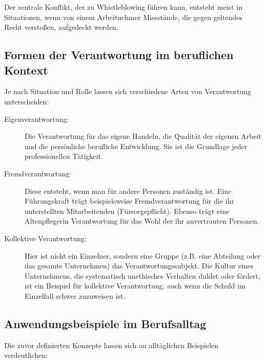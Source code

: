 \documentclass[
    12pt,               %
    a4paper,            %
    ngerman             %
]{scrartcl}
\begin{document}
Der zentrale Konflikt, der zu Whistleblowing führen kann, entsteht meist in Situationen, wenn von einem Arbeitnehmer Missstände, die gegen geltendes Recht verstoßen, aufgedeckt werden.

\subsection{Formen der Verantwortung im beruflichen Kontext}
Je nach Situation und Rolle lassen sich verschiedene Arten von Verantwortung unterscheiden:

\begin{description}
    \item[Eigenverantwortung:] Die Verantwortung für das eigene Handeln, die Qualität der eigenen Arbeit und die persönliche berufliche Entwicklung. Sie ist die Grundlage jeder professionellen Tätigkeit.
    \item[Fremdverantwortung:] Diese entsteht, wenn man für andere Personen zuständig ist. Eine Führungskraft trägt beispielsweise Fremdverantwortung für die ihr unterstellten Mitarbeitenden (Fürsorgepflicht). Ebenso trägt eine Altenpflegerin Verantwortung für das Wohl der ihr anvertrauten Personen.
    \item[Kollektive Verantwortung:] Hier ist nicht ein Einzelner, sondern eine Gruppe (z.B. eine Abteilung oder das gesamte Unternehmen) das Verantwortungssubjekt. Die Kultur eines Unternehmens, die systematisch unethisches Verhalten duldet oder fördert, ist ein Beispiel für kollektive Verantwortung, auch wenn die Schuld im Einzelfall schwer zuzuweisen ist.
\end{description}

\subsection{Anwendungsbeispiele im Berufsalltag}
Die zuvor definierten Konzepte lassen sich an alltäglichen Beispielen verdeutlichen:
\end{document}
